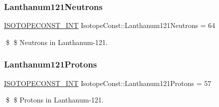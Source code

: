 \subsubsection{\texorpdfstring{Lanthanum121\+Neutrons}{Lanthanum121Neutrons}}
{\footnotesize\ttfamily \mbox{\hyperlink{group___isotope_const-_macros_ga5f18360b3e99483a35c32d789e62621c}{I\+S\+O\+T\+O\+P\+E\+C\+O\+N\+S\+T\+\_\+\+I\+NT}} Isotope\+Const\+::\+Lanthanum121\+Neutrons = 64}

\$ \$ Neutrons in Lanthanum-\/121. \mbox{\label{group___isotope_const-_lanthanum-_la121_gafd8ff348bd9eb6afb91660a2743af6bd}} 
\subsubsection{\texorpdfstring{Lanthanum121\+Protons}{Lanthanum121Protons}}
{\footnotesize\ttfamily \mbox{\hyperlink{group___isotope_const-_macros_ga5f18360b3e99483a35c32d789e62621c}{I\+S\+O\+T\+O\+P\+E\+C\+O\+N\+S\+T\+\_\+\+I\+NT}} Isotope\+Const\+::\+Lanthanum121\+Protons = 57}

\$ \$ Protons in Lanthanum-\/121. 
